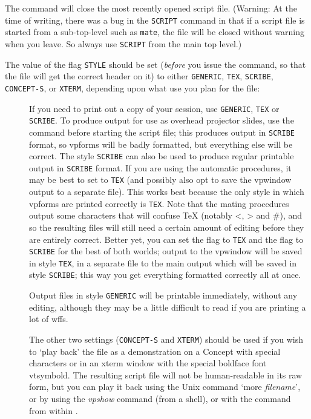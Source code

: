 The command  will close the most recently opened script file.
(Warning: At the time of writing, there was a bug in the {\tt SCRIPT} command
in that if a script file is started from a sub-top-level such as {\tt mate}, the
file will be closed without warning when you leave. So always use {\tt SCRIPT}
from the main top level.)

The value of the flag {\tt STYLE} should be set ({\it before} you issue the  command,
so that the file will get the correct header on it) to either {\tt GENERIC}, {\tt TEX}, {\tt SCRIBE},
{\tt CONCEPT-S}, or {\tt XTERM}, depending upon what use you plan for the
file:
\begin{description}
\item[] If you need to print out a copy of your session, use
{\tt GENERIC}, {\tt TEX} or {\tt SCRIBE}. To produce output for
use as overhead projector slides, use the command  before starting the
script file;
this produces output in {\tt SCRIBE} format, so vpforms will be badly formatted, but
everything else will be correct. The style {\tt SCRIBE} can also be used to produce
regular printable output in {\tt SCRIBE} format. If you are using the automatic
procedures, it may be best to set  to {\tt TEX} (and possibly also opt to save the vpwindow
output to a separate file). This works best because the only style
in which vpforms are printed correctly is {\tt TEX}. Note that the mating procedures output
some characters that will confuse TeX (notably <, > and \#), and so the resulting files will still
need a certain amount of editing before they are entirely correct.
Better yet, you can set the  flag to {\tt TEX} and the 
flag to {\tt SCRIBE} for the best of both worlds; output to the vpwindow will be saved in
style {\tt TEX}, in a separate file to the main output which will be saved in style {\tt SCRIBE};
this way you get everything formatted correctly all at once.

\item[] Output files in style {\tt GENERIC} will be printable immediately, without any editing,
although they may be a little difficult to read if you are printing a lot of wffs.

\item[] The other two settings ({\tt CONCEPT-S} and {\tt XTERM}) should be used if you wish to `play back'
the file as a demonstration on a Concept with special characters or
in an xterm window with the special boldface font vtsymbold.
The resulting script file will not be human-readable in its raw form, but you can play it back
using the Unix command `more {\it filename}',
or by using the {\it vpshow} command (from a shell), or with the  command
from within {\TPS}.
\end{description}


